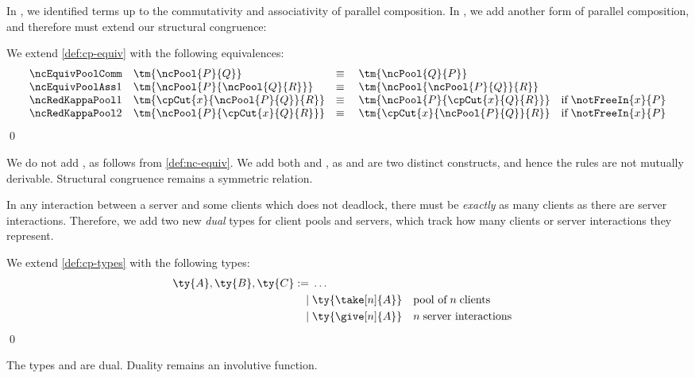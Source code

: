 \documentclass[UKenglish]{llncs}
\begin{document}
In \cp, we identified terms up to the commutativity and associativity of
parallel composition. In \nodcap, we add another form of parallel composition,
and therefore must extend our structural congruence:
\begin{definition}\label{def:nc-equiv}
  We extend \cref{def:cp-equiv} with the following equivalences:
  \[
    \begin{array}{llll}
      \ncEquivPoolComm
      & \tm{\ncPool{P}{Q}}
      & \equiv \;
      & \tm{\ncPool{Q}{P}}
      \\
      \ncEquivPoolAss1
      & \tm{\ncPool{P}{\ncPool{Q}{R}}}
      & \equiv \;
      & \tm{\ncPool{\ncPool{P}{Q}}{R}}
      \\
      \ncRedKappaPool1
      & \tm{\cpCut{x}{\ncPool{P}{Q}}{R}}
      & \equiv \;
      & \tm{\ncPool{P}{\cpCut{x}{Q}{R}}} \quad \text{if} \; \notFreeIn{x}{P} 
      \\
      \ncRedKappaPool2
      & \tm{\ncPool{P}{\cpCut{x}{Q}{R}}}
      & \equiv \;
      & \tm{\cpCut{x}{\ncPool{P}{Q}}{R}} \quad \text{if} \; \notFreeIn{x}{P}
    \end{array}
  \]
  \qed
\end{definition}
We do not add , as follows from \cref{def:nc-equiv}.
We add both  and , as  and
 are two distinct constructs, and hence the rules are not 
mutually derivable. Structural congruence remains a symmetric relation.

In any interaction between a server and some clients which does not deadlock,
there must be \emph{exactly} as many clients as there are server interactions.
Therefore, we add two new \emph{dual} types for client pools and servers, which
track how many clients or server interactions they represent.
\begin{definition}[Types]\label{def:nc-types}
  We extend \cref{def:cp-types} with the following types:
  \[\!
    \begin{aligned}
      \ty{A}, \ty{B}, \ty{C}
           :=& \; \dots
      \\ \mid& \; \ty{\take[n]{A}} &&\text{pool of} \; n \; \text{clients}
      \\ \mid& \; \ty{\give[n]{A}} &&n \; \text{server interactions}
    \end{aligned}
  \]  
  \qed
\end{definition}
The types  and  are dual.
Duality remains an involutive function.
\end{document}
